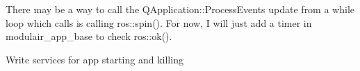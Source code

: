 There may be a way to call the QApplication::ProcessEvents update from a while loop which calls is calling ros::spin().  For now, I will just add a timer in modulair_app_base to check ros::ok(). 


Write services for app starting and killing
